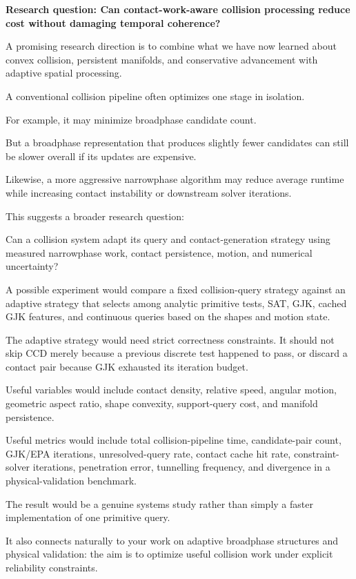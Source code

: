 \textbf{Research question: Can contact-work-aware collision processing reduce cost without damaging temporal coherence?}

A promising research direction is to combine what we have now learned about convex collision, persistent manifolds, and conservative advancement with adaptive spatial processing.

A conventional collision pipeline often optimizes one stage in isolation.

For example, it may minimize broadphase candidate count.

But a broadphase representation that produces slightly fewer candidates can still be slower overall if its updates are expensive.

Likewise, a more aggressive narrowphase algorithm may reduce average runtime while increasing contact instability or downstream solver iterations.

This suggests a broader research question:

Can a collision system adapt its query and contact-generation strategy using measured narrowphase work, contact persistence, motion, and numerical uncertainty?

A possible experiment would compare a fixed collision-query strategy against an adaptive strategy that selects among analytic primitive tests, SAT, GJK, cached GJK features, and continuous queries based on the shapes and motion state.

The adaptive strategy would need strict correctness constraints. It should not skip CCD merely because a previous discrete test happened to pass, or discard a contact pair because GJK exhausted its iteration budget.

Useful variables would include contact density, relative speed, angular motion, geometric aspect ratio, shape convexity, support-query cost, and manifold persistence.

Useful metrics would include total collision-pipeline time, candidate-pair count, GJK/EPA iterations, unresolved-query rate, contact cache hit rate, constraint-solver iterations, penetration error, tunnelling frequency, and divergence in a physical-validation benchmark.

The result would be a genuine systems study rather than simply a faster implementation of one primitive query.

It also connects naturally to your work on adaptive broadphase structures and physical validation: the aim is to optimize useful collision work under explicit reliability constraints.

